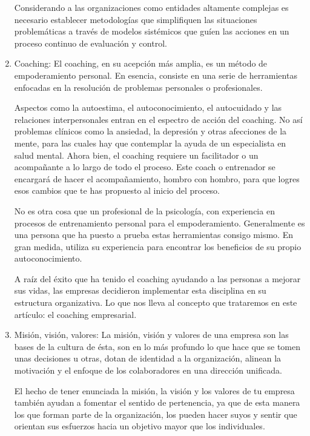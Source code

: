 \documentclass[letterpaper,12pt]{article}
\begin{document}
\begin{sloppypar}
\begin{enumerate}
    Considerando a las organizaciones como entidades altamente complejas es necesario establecer metodologías que simplifiquen las situaciones problemáticas a través de modelos sistémicos que guíen las acciones en un proceso continuo de evaluación y control.

    \item Coaching: El coaching, en su acepción más amplia, es un método de empoderamiento personal. En esencia, consiste en una serie de herramientas enfocadas en la resolución de problemas personales o profesionales.

    Aspectos como la autoestima, el autoconocimiento, el autocuidado y las relaciones interpersonales entran en el espectro de acción del coaching. No así problemas clínicos como la ansiedad, la depresión y otras afecciones de la mente, para las cuales hay que contemplar la ayuda de un especialista en salud mental. Ahora bien, el coaching requiere un facilitador o un acompañante a lo largo de todo el proceso. Este coach o entrenador se encargará de hacer el acompañamiento, hombro con hombro, para que logres esos cambios que te has propuesto al inicio del proceso.

    No es otra cosa que un profesional de la psicología, con experiencia en procesos de entrenamiento personal para el empoderamiento. Generalmente es una persona que ha puesto a prueba estas herramientas consigo mismo. En gran medida, utiliza su experiencia para encontrar los beneficios de su propio autoconocimiento.
    
    A raíz del éxito que ha tenido el coaching ayudando a las personas a mejorar sus vidas, las empresas decidieron implementar esta disciplina en su estructura organizativa. Lo que nos lleva al concepto que trataremos en este artículo: el coaching empresarial.

    \item Misión, visión, valores: La misión, visión y valores de una empresa son las bases de la cultura de ésta, son en lo más profundo lo que hace que se tomen unas decisiones u otras, dotan de identidad a la organización, alinean la motivación y el enfoque de los colaboradores en una dirección unificada.

    El hecho de tener enunciada la misión, la visión y los valores de tu empresa también ayudan a fomentar el sentido de pertenencia, ya que de esta manera los que forman parte de la organización, los pueden hacer suyos y sentir que orientan sus esfuerzos hacia un objetivo mayor que los individuales.
    

\end{enumerate}
\end{sloppypar}
\end{document}
